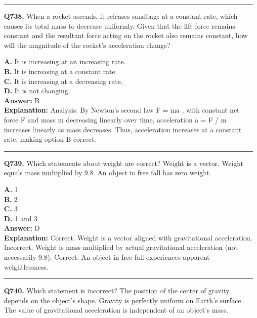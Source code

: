 \documentclass[12pt]{article}
\begin{document}
\hrule
\vspace{1em}


\noindent
\textbf{Q738.} When a rocket ascends, it releases sandbags at a constant rate, which causes its total mass to decrease uniformly. Given that the lift force remains constant and the resultant force acting on the rocket also remains constant, how will the magnitude of the rocket's acceleration change?



\textbf{A.} It is increasing at an increasing rate. \\
\textbf{B.} It is increasing at a constant rate. \\
\textbf{C.} It is increasing at a decreasing rate. \\
\textbf{D.} It is not changing. \\

\textbf{Answer:} B \\
\textbf{Explanation:} Analysis: By Newton’s second law
F
=
ma
, with constant net force
F
and mass
m
decreasing linearly over time, acceleration
a
=
F
/
m
increases linearly as mass decreases. Thus, acceleration increases at a constant rate, making option B correct.

\hrule
\vspace{1em}


\noindent
\textbf{Q739.} Which statements about weight are correct?
Weight is a vector.
Weight equals mass multiplied by 9.8.
An object in free fall has zero weight.



\textbf{A.} 1 \\
\textbf{B.} 2 \\
\textbf{C.} 3 \\
\textbf{D.} 1 and 3 \\

\textbf{Answer:} D \\
\textbf{Explanation:} Correct. Weight is a vector aligned with gravitational acceleration.
Incorrect. Weight is mass multiplied by actual gravitational acceleration (not necessarily 9.8).
Correct. An object in free fall experiences apparent weightlessness.

\hrule
\vspace{1em}


\noindent
\textbf{Q740.} Which statement is incorrect?
The position of the center of gravity depends on the object’s shape.
Gravity is perfectly uniform on Earth’s surface.
The value of gravitational acceleration is independent of an object’s mass.
\end{document}
